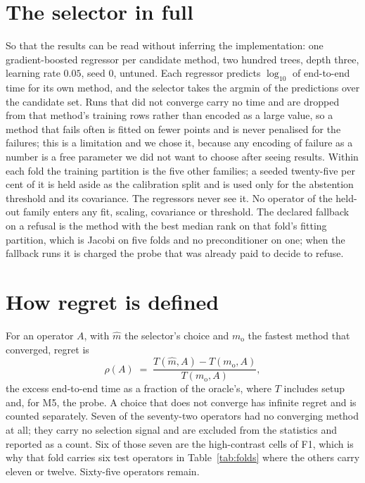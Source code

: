 \documentclass[11pt]{article}
\begin{document}
\section{The selector in full}

So that the results can be read without inferring the implementation: one gradient-boosted
regressor per candidate method, two hundred trees, depth three, learning rate $0.05$, seed
$0$, untuned. Each regressor predicts $\log_{10}$ of end-to-end time for its own method,
and the selector takes the argmin of the predictions over the candidate set. Runs that did
not converge carry no time and are dropped from that method's training rows rather than
encoded as a large value, so a method that fails often is fitted on fewer points and is
never penalised for the failures; this is a limitation and we chose it, because any
encoding of failure as a number is a free parameter we did not want to choose after seeing
results. Within each fold the training partition is the five other families; a seeded
twenty-five per cent of it is held aside as the calibration split and is used only for the
abstention threshold and its covariance. The regressors never see it. No operator of the
held-out family enters any fit, scaling, covariance or threshold. The declared fallback on
a refusal is the method with the best median rank on that fold's fitting partition,
which is Jacobi on five folds and no preconditioner on one; when the fallback runs it is
charged the probe that was already paid to decide to refuse.

\section{How regret is defined}
\label{sec:score}

For an operator $A$, with $\hat m$ the selector's choice and $m_{\mathrm o}$ the
fastest method that converged, regret is
\[
  \rho(A) \;=\; \frac{T(\hat m, A) - T(m_{\mathrm o}, A)}{T(m_{\mathrm o}, A)},
\]
the excess end-to-end time as a fraction of the oracle's, where $T$ includes
setup and, for M5, the probe. A choice that does not converge has infinite
regret and is counted separately.
Seven of the seventy-two operators had no converging method at all; they carry no
selection signal and are excluded from the statistics and reported as a count.
Six of those seven are the high-contrast cells of F1, which is why that fold
carries six test operators in Table~\ref{tab:folds} where the others carry
eleven or twelve. Sixty-five operators remain.
\end{document}

